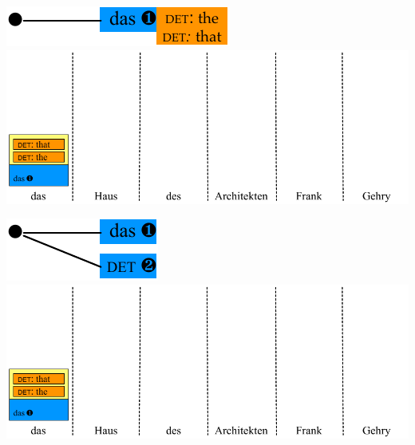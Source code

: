 \documentclass[landscape]{slides}
\begin{document}
\begin{center}\vspace{15mm}
\includegraphics[scale=1.4]{accessing-grammar-rules-prefix-early1.pdf}\\[27mm]
\includegraphics[scale=1.4]{accessing-grammar-rules-early-example2.pdf}
\end{center}


\begin{center}\vspace{13mm}
\includegraphics[scale=1.4]{accessing-grammar-rules-prefix-early2.pdf}\\[22mm]
\includegraphics[scale=1.4]{accessing-grammar-rules-early-example2.pdf}
\end{center}

\end{document}

